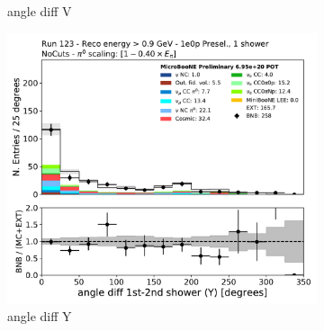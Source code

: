 \begin{figure}[H]
\begin{subfigure}{0.3\textwidth}
    \caption{angle diff V}
    \end{subfigure}
    \begin{subfigure}{0.3\textwidth}
    \includegraphics[width=1.0\textwidth]{1e0p/High_E_Sideband/anglediff_Y.pdf}
    \caption{angle diff Y}
    \end{subfigure}
    \caption{} 
    \label{fig:1e0p:High_E_Sideband:datamc1}
\end{figure}

